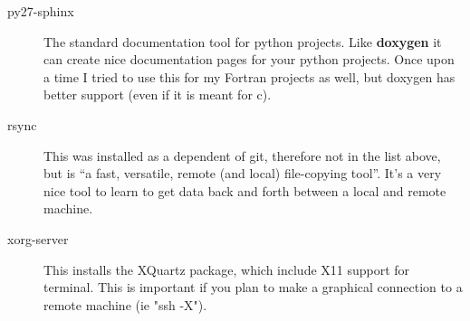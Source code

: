 \documentclass[11pt]{article}
\begin{document}
\begin{description}
	\item[py27-sphinx] The standard documentation tool for python projects. Like {\bf doxygen} it can create nice documentation pages for your python projects. Once upon a time I tried to use this for my Fortran projects as well, but doxygen has better support (even if it is meant for c).
	\item[rsync] This was installed as a dependent of git, therefore not in the list above, but is ``a fast, versatile, remote (and local) file-copying tool''. It's a very nice tool to learn to get data back and forth between a local and remote machine.
	\item[xorg-server] This installs the XQuartz package, which include X11 support for terminal. This is important if you plan to make a graphical connection to a remote machine (ie "ssh -X"). 
\end{description}

%
%
\end{document}
